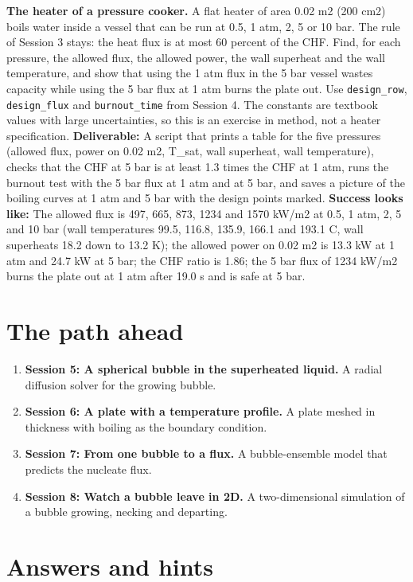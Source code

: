 \documentclass[11pt,a4paper]{article}
\begin{document}
\textbf{The heater of a pressure cooker.} A flat heater of area 0.02 m2 (200 cm2) boils water inside a vessel that can be run at 0.5, 1 atm, 2, 5 or 10 bar. The rule of Session 3 stays: the heat flux is at most 60 percent of the CHF. Find, for each pressure, the allowed flux, the allowed power, the wall superheat and the wall temperature, and show that using the 1 atm flux in the 5 bar vessel wastes capacity while using the 5 bar flux at 1 atm burns the plate out. Use \texttt{design\_row}, \texttt{design\_flux} and \texttt{burnout\_time} from Session 4. The constants are textbook values with large uncertainties, so this is an exercise in method, not a heater specification. \textbf{Deliverable:} A script that prints a table for the five pressures (allowed flux, power on 0.02 m2, T\_sat, wall superheat, wall temperature), checks that the CHF at 5 bar is at least 1.3 times the CHF at 1 atm, runs the burnout test with the 5 bar flux at 1 atm and at 5 bar, and saves a picture of the boiling curves at 1 atm and 5 bar with the design points marked. \textbf{Success looks like:} The allowed flux is 497, 665, 873, 1234 and 1570 kW/m2 at 0.5, 1 atm, 2, 5 and 10 bar (wall temperatures 99.5, 116.8, 135.9, 166.1 and 193.1 C, wall superheats 18.2 down to 13.2 K); the allowed power on 0.02 m2 is 13.3 kW at 1 atm and 24.7 kW at 5 bar; the CHF ratio is 1.86; the 5 bar flux of 1234 kW/m2 burns the plate out at 1 atm after 19.0 s and is safe at 5 bar.

\section{The path ahead}
\begin{enumerate}[nosep]
\item \textbf{Session 5: A spherical bubble in the superheated liquid.} A radial diffusion solver for the growing bubble.
\item \textbf{Session 6: A plate with a temperature profile.} A plate meshed in thickness with boiling as the boundary condition.
\item \textbf{Session 7: From one bubble to a flux.} A bubble-ensemble model that predicts the nucleate flux.
\item \textbf{Session 8: Watch a bubble leave in 2D.} A two-dimensional simulation of a bubble growing, necking and departing.
\end{enumerate}

\section{Answers and hints}
\end{document}
